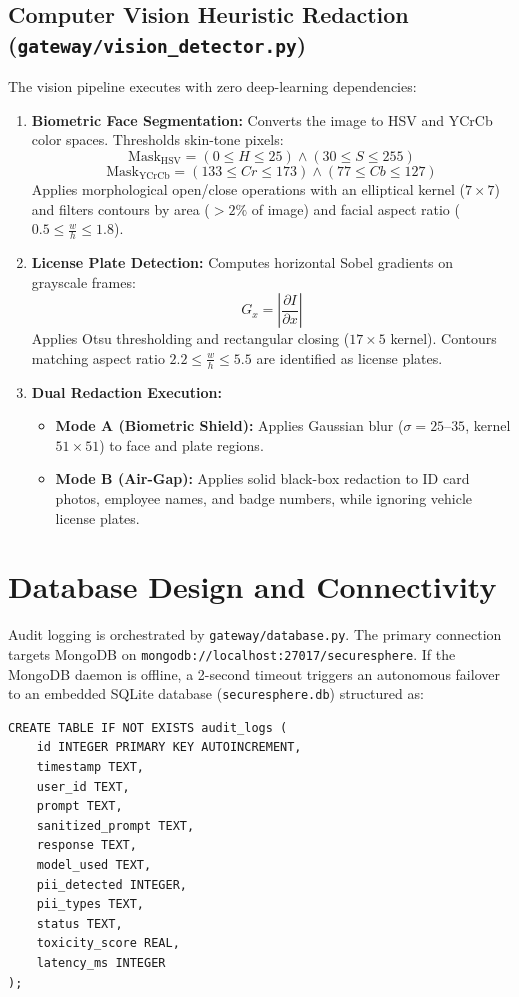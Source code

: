 \documentclass[12pt,a4paper,oneside]{report}
\numberwithin{equation}{chapter}
\begin{document}
\subsection{Computer Vision Heuristic Redaction (\texttt{gateway/vision\_detector.py})}
The vision pipeline executes with zero deep-learning dependencies:
\begin{enumerate}[leftmargin=*]
    \item \textbf{Biometric Face Segmentation:} Converts the image to HSV and YCrCb color spaces. Thresholds skin-tone pixels:
    \begin{equation}
    \text{Mask}_{\text{HSV}} = (0 \le H \le 25) \land (30 \le S \le 255)
    \end{equation}
    \begin{equation}
    \text{Mask}_{\text{YCrCb}} = (133 \le Cr \le 173) \land (77 \le Cb \le 127)
    \end{equation}
    Applies morphological open/close operations with an elliptical kernel ($7 \times 7$) and filters contours by area ($>2\%$ of image) and facial aspect ratio ($0.5 \le \frac{w}{h} \le 1.8$).
    \item \textbf{License Plate Detection:} Computes horizontal Sobel gradients on grayscale frames:
    \begin{equation}
    G_x = \left| \frac{\partial I}{\partial x} \right|
    \end{equation}
    Applies Otsu thresholding and rectangular closing ($17 \times 5$ kernel). Contours matching aspect ratio $2.2 \le \frac{w}{h} \le 5.5$ are identified as license plates.
    \item \textbf{Dual Redaction Execution:}
    \begin{itemize}
        \item \textbf{Mode A (Biometric Shield):} Applies Gaussian blur ($\sigma = 25$--$35$, kernel $51 \times 51$) to face and plate regions.
        \item \textbf{Mode B (Air-Gap):} Applies solid black-box redaction to ID card photos, employee names, and badge numbers, while ignoring vehicle license plates.
    \end{itemize}
\end{enumerate}

\section{Database Design and Connectivity}
Audit logging is orchestrated by \texttt{gateway/database.py}. The primary connection targets MongoDB on \texttt{mongodb://localhost:27017/securesphere}. If the MongoDB daemon is offline, a 2-second timeout triggers an autonomous failover to an embedded SQLite database (\texttt{securesphere.db}) structured as:
\begin{verbatim}
CREATE TABLE IF NOT EXISTS audit_logs (
    id INTEGER PRIMARY KEY AUTOINCREMENT,
    timestamp TEXT,
    user_id TEXT,
    prompt TEXT,
    sanitized_prompt TEXT,
    response TEXT,
    model_used TEXT,
    pii_detected INTEGER,
    pii_types TEXT,
    status TEXT,
    toxicity_score REAL,
    latency_ms INTEGER
);
\end{verbatim}
\end{document}
